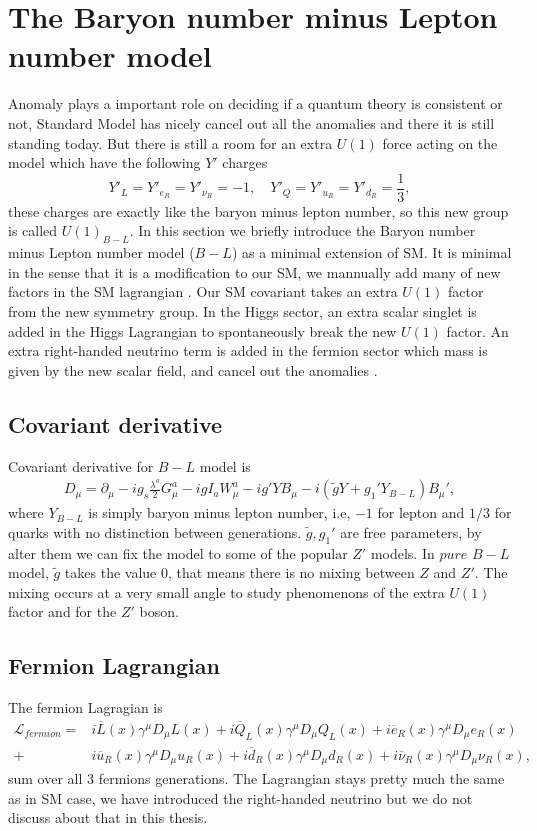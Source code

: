 \documentclass{report}
\newcommand{\nn}{\nonumber}
\numberwithin{equation}{section}
\begin{document}
\section{The Baryon number minus Lepton number model}
Anomaly plays a important role on deciding if a quantum theory is consistent or not, Standard Model has nicely cancel out all the anomalies and there it is still standing today. But there is still a room for an extra $U(1)$ force acting on the model which have the following $Y'$ charges
\begin{equation}
    Y'_L=Y'_{e_R}=Y'_{\nu_R}=-1, \quad  Y'_Q=Y'_{u_R}=Y'_{d_R}=\frac{1}{3},
\end{equation}
these charges are exactly like the baryon minus lepton number, so this new group is called $U(1)_{B-L}$.
In this section we briefly introduce the Baryon number minus Lepton number model ($B-L$) as a minimal extension of SM. It is minimal in the sense that it is a modification to our SM, we mannually add many of new factors in the SM lagrangian . Our SM covariant takes an extra $U(1)$ factor from the new symmetry group. In  the Higgs sector, an extra scalar singlet is added in the Higgs Lagrangian to spontaneously break the new $U(1)$ factor. An extra right-handed neutrino term is added in the fermion sector which mass is given by the new scalar field, and cancel out the anomalies \cite{Basso:2011hn}.
\subsection{Covariant derivative}
Covariant derivative for $B-L$ model is
\begin{align}
D_\mu=\partial_\mu - ig_s \frac{\lambda^a}{2}G_\mu^a-i g I_a W_\mu^a-i g' YB_\mu -i(\tilde{g} Y+ g_1' Y_{B-L})B_\mu',
\end{align}
where $Y_{B-L}$ is simply baryon minus lepton number, i.e, $-1$ for lepton and $1/3$ for quarks with no distinction between generations. $\tilde{g},g_1'$ are free parameters, by alter them we can fix the model to some of the popular $Z'$ models. In $pure$ $B-L$ model, $\tilde{g}$ takes the value 0, that means there is no mixing between $Z$ and $Z'$. The mixing occurs at a very small angle to study phenomenons of the extra $U(1)$ factor and for the $Z'$ boson.\\
\subsection{Fermion Lagrangian}
The fermion Lagragian is
\begin{align}
\mathcal{L}_{fermion}=& i\overline{L}(x) \gamma^\mu D_\mu L(x)+i\overline{Q}_L(x) \gamma^\mu D_\mu Q_L(x)+
i\overline{e}_R(x) \gamma^\mu D_\mu e_R(x)\nn\\+
&i\overline{u}_R(x) \gamma^\mu D_\mu u_R(x)+
i\overline{d}_R(x) \gamma^\mu D_\mu d_R(x)+
i\overline{\nu}_R(x) \gamma^\mu D_\mu \nu_R(x),
\end{align}
sum over all 3 fermions generations. The Lagrangian stays pretty much the same as in SM case, we have introduced the right-handed neutrino but we do not discuss about that in this thesis.
\end{document}
